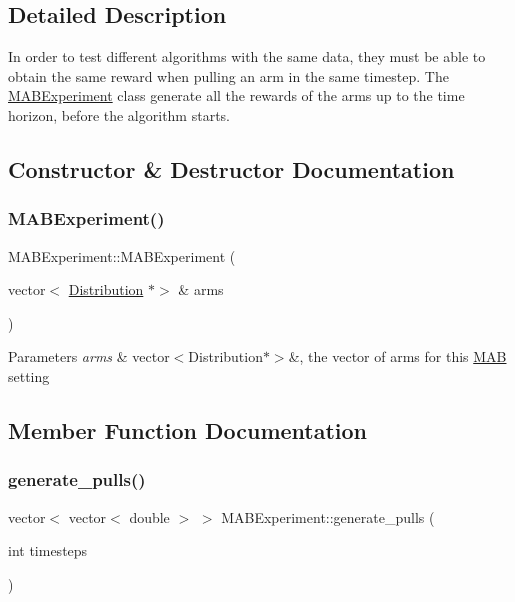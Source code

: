 \subsection{Detailed Description}
In order to test different algorithms with the same data, they must be able to obtain the same reward when pulling an arm in the same timestep. The \mbox{\hyperlink{class_m_a_b_experiment}{M\+A\+B\+Experiment}} class generate all the rewards of the arms up to the time horizon, before the algorithm starts. 

\subsection{Constructor \& Destructor Documentation}
\mbox{\label{class_m_a_b_experiment_a1f24b5ccad7521d47a7f4c3961867063}} 
\subsubsection{\texorpdfstring{M\+A\+B\+Experiment()}{MABExperiment()}}
{\footnotesize\ttfamily M\+A\+B\+Experiment\+::\+M\+A\+B\+Experiment (\begin{DoxyParamCaption}\item[{vector$<$ \mbox{\hyperlink{class_distribution}{Distribution}} $\ast$$>$ \&}]{arms }\end{DoxyParamCaption})}


\begin{DoxyParams}{Parameters}
{\em arms} & vector$<$\+Distribution$\ast$$>$\&, the vector of arms for this \mbox{\hyperlink{class_m_a_b}{M\+AB}} setting \\
\hline
\end{DoxyParams}


\subsection{Member Function Documentation}
\mbox{\label{class_m_a_b_experiment_af31d09524129608838d5262678e8de18}} 
\subsubsection{\texorpdfstring{generate\+\_\+pulls()}{generate\_pulls()}}
{\footnotesize\ttfamily vector$<$ vector$<$ double $>$ $>$ M\+A\+B\+Experiment\+::generate\+\_\+pulls (\begin{DoxyParamCaption}\item[{int}]{timesteps }\end{DoxyParamCaption})}




